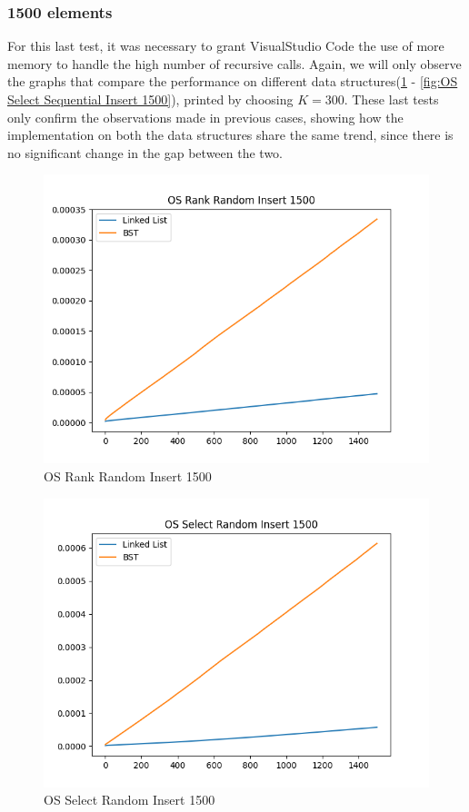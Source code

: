 \documentclass[11pt]{article}
\begin{document}
\subsubsection{1500 elements}
For this last test, it was necessary to grant VisualStudio Code the use of more memory to handle the high number of recursive calls. Again, we will only observe the graphs that compare the performance on different data structures(\ref{fig:OS Rank Random Insert 1500} - \ref{fig:OS Select Sequential Insert 1500}), printed by choosing $K = 300$. These last tests only confirm the observations made in previous cases, showing how the implementation on both the data structures share the same trend, since there is no significant change in the gap between the two.
 \begin{figure}[H]
  \centering
  \includegraphics[width=0.8\linewidth]{Images/1500/OS Rank Random Insert 1500.png}
  \caption{OS Rank Random Insert 1500 }
  \label{fig:OS Rank Random Insert 1500}
\end{figure}
 \begin{figure}[H]
  \centering
  \includegraphics[width=0.8\linewidth]{Images/1500/OS Select Random Insert 1500.png}
  \caption{OS Select Random Insert 1500 }
  \label{fig:OS Select Random Insert 1500}
\end{figure}
\end{document}
